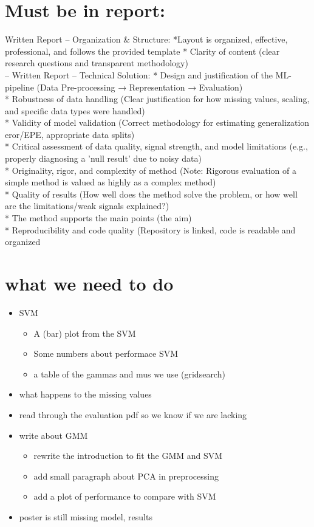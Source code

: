 \documentclass{article}
\begin{document}
\section{Must be in report:}
 Written Report – Organization \& Structure:
*Layout is organized, effective, professional, and follows the provided template
* Clarity of content (clear research questions and transparent methodology)
\\
– Written Report – Technical Solution:
* Design and justification of the ML-pipeline (Data Pre-processing → Representation →
Evaluation)
\\
* Robustness of data handling (Clear justification for how missing values, scaling, and
specific data types were handled)
\\
* Validity of model validation (Correct methodology for estimating generalization eror/EPE, appropriate data splits)
\\
* Critical assessment of data quality, signal strength, and model limitations (e.g., properly
diagnosing a ’null result’ due to noisy data)
\\
* Originality, rigor, and complexity of method (Note: Rigorous evaluation of a simple
method is valued as highly as a complex method)
\\
* Quality of results (How well does the method solve the problem, or how well are the
limitations/weak signals explained?)
\\
* The method supports the main points (the aim)
\\
* Reproducibility and code quality (Repository is linked, code is readable and organized


\newpage
\section{what we need to do}
\begin{itemize}
    \item SVM
    \begin{itemize}
        \item A (bar) plot from the SVM 
        \item Some numbers about performace SVM
        \item a table of the gammas and mus we use (gridsearch)
    \end{itemize}
    \item what happens to the missing values 
    \item read through the evaluation pdf so we know if we are lacking
    \item write about GMM
    \begin{itemize}
        \item rewrite the introduction to fit the GMM and SVM
        \item add small paragraph about PCA in preprocessing
        \item add a plot of performance to compare with SVM
    \end{itemize}
    \item poster is still missing model, results 
\end{itemize}
\end{document}
